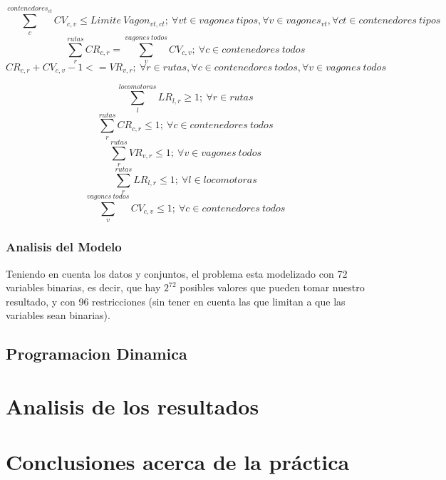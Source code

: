 \documentclass[11pt,spanish]{article}
\begin{document}
			\begin{equation}
				\sum_c^{contenedores_{ct}}CV_{c,v} \leq Limite\ Vagon_{vt,ct};\ \forall vt \in vagones\ tipos, \forall v \in vagones_{vt}, \forall ct \in contenedores\ tipos
			\end{equation}
			\begin{equation}
				\sum_r^{rutas} CR_{c,r} = \sum_v^{vagones\ todos} CV_{c,v};\ \forall c \in contenedores\ todos
			\end{equation}
			\begin{equation}
				CR_{c,r}+CV_{c,v}-1<=VR_{v,r};\ \forall r \in rutas, \forall c \in contenedores\ todos, \forall v \in vagones\ todos
			\end{equation}


			\begin{equation}
			\sum_l^{locomotoras}LR_{l,r} \geq 1;\ \forall r \in rutas
			\end{equation}
			\begin{equation}
			\sum_r^{rutas}CR_{c,r} \leq 1;\ \forall c \in contenedores\ todos
			\end{equation}
			\begin{equation}
			\sum_r^{rutas}VR_{v,r} \leq 1;\ \forall v \in vagones\ todos
			\end{equation}
			\begin{equation}
			\sum_r^{rutas} LR_{l,r} \leq 1;\ \forall l \in locomotoras
			\end{equation}
			\begin{equation}
			\sum_v^{vagones\ todos}CV_{c,v} \leq 1;\ \forall c \in contenedores\ todos
			\end{equation}
			\subsubsection{Analisis del Modelo}
			Teniendo en cuenta los datos y conjuntos, el problema esta modelizado con 72 variables binarias, es decir, que hay $2^{72}$ posibles valores que pueden tomar nuestro resultado, y con 96 restricciones (sin tener en cuenta las que limitan a que las variables sean binarias).
		\subsection{Programacion Dinamica}
	\section{Analisis de los resultados}
	\section{Conclusiones acerca de la práctica}
	\newpage
\end{document}
